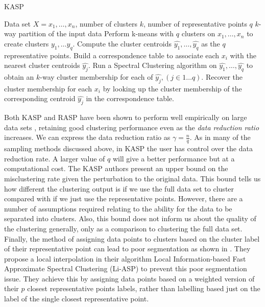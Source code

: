 \begin{algorithm}[h!]
\caption{KASP}
  \begin{algorithmic}[1]
   \REQUIRE Data set $X = {x_1,\ldots, x_n}$, number of clusters $k$, number of representative points $q$
   \ENSURE  $k$-way partition of the input data
   \STATE Perform k-means with $q$ clusters on $x_1, \hdots, x_n$ to create clusters $y_1, \hdots y_q$.
   \STATE Compute the cluster centroids $\widehat{y_1}, \hdots, \widehat{y_q}$ as the $q$ representative points.
   \STATE Build a correspondence table to associate each $x_i$ with the nearest cluster centroids $\widehat{y_j}$.
   \STATE Run a Spectral Clustering algorithm on $\widehat{y_1}, \hdots, \widehat{y_q}$ to obtain an $k$-way cluster membership
   for each of $\widehat{y_j}, (j \in 1 \hdots q)$.
   \STATE Recover the cluster membership for each $x_i$ by looking up the cluster membership of the corresponding centroid $\widehat{y_j}$ in the correspondence table.
  \end{algorithmic}
\label{alg:kasp}
\end{algorithm}

Both KASP and RASP have been shown to perform well empirically on large data sets \citep{Yan2009}, retaining good clustering performance even as the \textit{data reduction ratio} increases. We can express the data reduction ratio as $\gamma = \frac{n}{q}$. As in many of the sampling methods discussed above, in KASP the user has control over the data reduction rate. A larger value of $q$ will give a better performance but at a computational cost. The KASP authors present an upper bound on the misclustering rate given the perturbation to the original data. This bound tells us how different the clustering output is if we use the full data set to cluster compared with if we just use the representative points. However, there are a number of assumptions required \citep{Huang2008} relating to the ability for the data to be separated into clusters. Also, this bound does not inform us about the quality of the clustering generally, only as a comparison to clustering the full data set. Finally, the method of assigning data points to clusters based on the cluster label of their representative point can lead to poor segmentation as shown in \cite{Cao2014}. They propose a local interpolation in their algorithm Local Information-based Fast Approximate Spectral Clustering (Li-ASP) to prevent this poor segmentation issue. They achieve this by assigning data points based on a weighted version of their $p$ closest representative points labels, rather than labelling based just on the label of the single closest representative point. 
 
